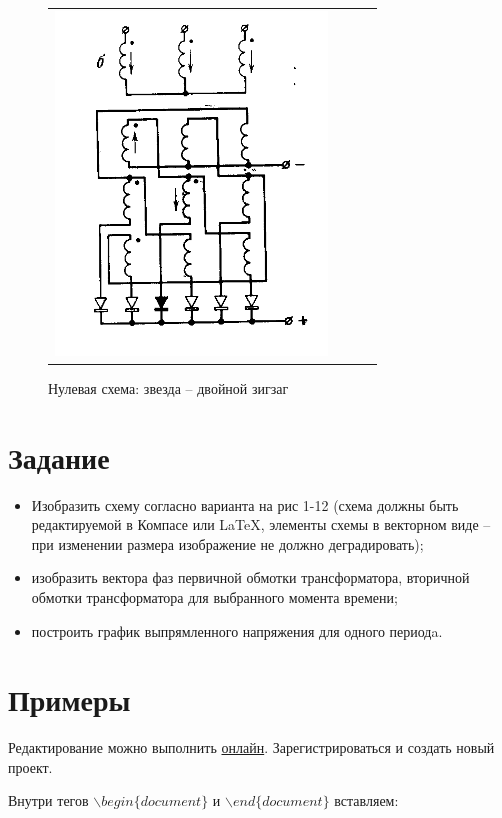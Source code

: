 \begin{figure}[!ht]
\begin{tabular}{cccc}
\begin{minipage}{0.22\textwidth}
        \includegraphics[scale=0.3]{schema12}
	\caption{\small Нулевая схема: звезда -- двойной зигзаг}
\end{minipage}
       \\
\end{tabular}
\end{figure}


\section*{Задание}
\begin{itemize}
	\item Изобразить схему согласно варианта на рис 1-12 (схема должны быть редактируемой в Компасе или \LaTeX \cite{circuitikz}, элементы схемы в векторном виде -- при изменении размера изображение не должно деградировать);
	\item изобразить вектора фаз первичной обмотки трансформатора, вторичной обмотки трансформатора для выбранного момента времени;
	\item построить график выпрямленного напряжения для одного периодa.

\end{itemize}



\section*{Примеры}

Редактирование можно выполнить \href{overleaf.com}{онлайн}.
Зарегистрироваться и создать новый проект.



Внутри тегов $\backslash begin\{document\}$ и $\backslash end\{document\}$ вставляем: 


